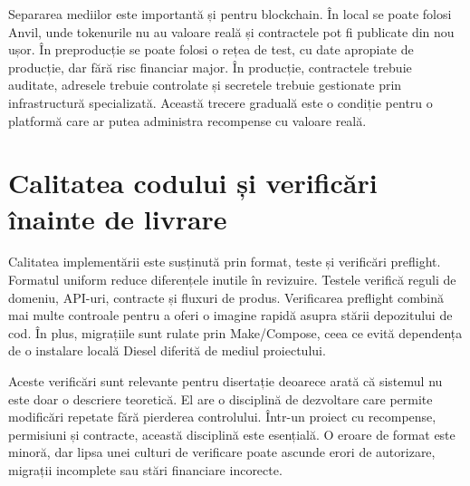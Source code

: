 Separarea mediilor este importantă și pentru blockchain. În local se poate folosi Anvil, unde tokenurile nu au valoare reală și contractele pot fi publicate din nou ușor. În preproducție se poate folosi o rețea de test, cu date apropiate de producție, dar fără risc financiar major. În producție, contractele trebuie auditate, adresele trebuie controlate și secretele trebuie gestionate prin infrastructură specializată. Această trecere graduală este o condiție pentru o platformă care ar putea administra recompense cu valoare reală.

\section{Calitatea codului și verificări înainte de livrare}
Calitatea implementării este susținută prin format, teste și verificări preflight. Formatul uniform reduce diferențele inutile în revizuire. Testele verifică reguli de domeniu, API-uri, contracte și fluxuri de produs. Verificarea preflight combină mai multe controale pentru a oferi o imagine rapidă asupra stării depozitului de cod. În plus, migrațiile sunt rulate prin Make/Compose, ceea ce evită dependența de o instalare locală Diesel diferită de mediul proiectului.

Aceste verificări sunt relevante pentru disertație deoarece arată că sistemul nu este doar o descriere teoretică. El are o disciplină de dezvoltare care permite modificări repetate fără pierderea controlului. Într-un proiect cu recompense, permisiuni și contracte, această disciplină este esențială. O eroare de format este minoră, dar lipsa unei culturi de verificare poate ascunde erori de autorizare, migrații incomplete sau stări financiare incorecte.
